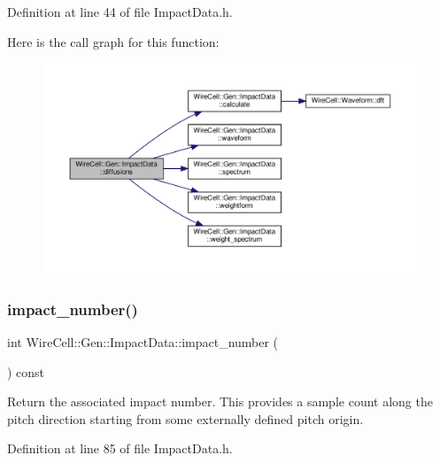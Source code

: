 Definition at line 44 of file Impact\+Data.\+h.

Here is the call graph for this function\+:
\nopagebreak
\begin{figure}[H]
\begin{center}
\leavevmode
\includegraphics[width=350pt]{class_wire_cell_1_1_gen_1_1_impact_data_a90443997dcd6a04fafe2f1c1fbd90bce_cgraph}
\end{center}
\end{figure}
\mbox{\label{class_wire_cell_1_1_gen_1_1_impact_data_a00db275ffb82f82831016b7ebaaed6e3}} 
\subsubsection{\texorpdfstring{impact\+\_\+number()}{impact\_number()}}
{\footnotesize\ttfamily int Wire\+Cell\+::\+Gen\+::\+Impact\+Data\+::impact\+\_\+number (\begin{DoxyParamCaption}{ }\end{DoxyParamCaption}) const\hspace{0.3cm}{\ttfamily [inline]}}

Return the associated impact number. This provides a sample count along the pitch direction starting from some externally defined pitch origin. 

Definition at line 85 of file Impact\+Data.\+h.

